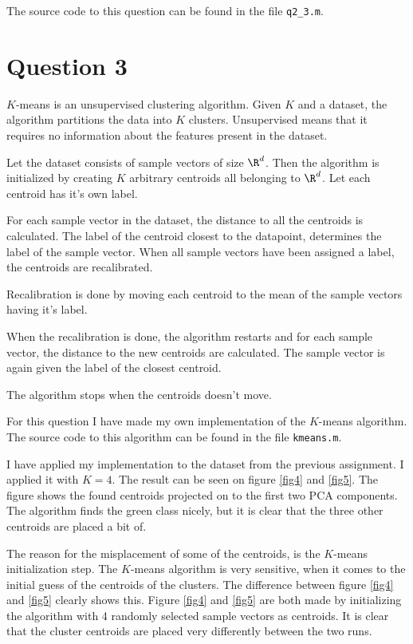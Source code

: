 \documentclass[10pt]{article}
\begin{document}
The source code to this question can be found in the file \texttt{q2\_3.m}.


\section*{Question 3} %
\label{sec:question_3}
$K$-means is an unsupervised clustering algorithm. Given $K$ and a dataset, the algorithm partitions the data into $K$ clusters. Unsupervised means that it requires no information about the features present in the dataset.

Let the dataset consists of sample vectors of size $\R^d$. Then the algorithm is initialized by creating $K$ arbitrary centroids all belonging to $\R^d$. Let each centroid has it's own label. 

For each sample vector in the dataset, the distance to all the centroids is calculated. The label of the centroid closest to the datapoint, determines the label of the sample vector. When all sample vectors have been assigned a label, the centroids are recalibrated. 

Recalibration is done by moving each centroid to the mean of the sample vectors having it's label. 

When the recalibration is done, the algorithm restarts and for each sample vector, the distance to the new centroids are calculated. The sample vector is again given the label of the closest centroid.

The algorithm stops when the centroids doesn't move.

For this question I have made my own implementation of the $K$-means algorithm. The source code to this algorithm can be found in the file \texttt{kmeans.m}. 

I have applied my implementation to the dataset from the previous assignment. I applied it with $K=4$. The result can be seen on figure \ref{fig4} and \ref{fig5}. The figure shows the found centroids projected on to the first two PCA components. The algorithm finds the green class nicely, but it is clear that the three other centroids are placed a bit of.

The reason for the misplacement of some of the centroids, is the $K$-means initialization step. The $K$-means algorithm is very sensitive, when it comes to the initial guess of the centroids of the clusters. The difference between figure \ref{fig4} and \ref{fig5} clearly shows this. Figure \ref{fig4} and \ref{fig5} are both made by initializing the algorithm with 4 randomly selected sample vectors as centroids. It is clear that the cluster centroids are placed very differently between the two runs.
\end{document}
